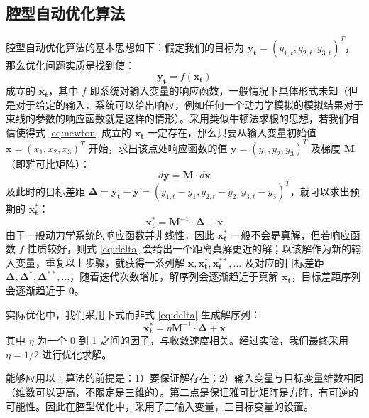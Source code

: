\subsection{腔型自动优化算法}
腔型自动优化算法的基本思想如下：假定我们的目标为 $\mathbf{y_t} = (y_{1,t}, y_{2,t}, y_{3,t})^T$，那么优化问题实质是找到使：
\begin{equation}
\label{eq:newton}
\mathbf{y_t} = f(\mathbf{x_t})
\end{equation}
成立的 $\mathbf{x_t}$，其中 $f$ 即系统对输入变量的响应函数，一般情况下具体形式未知（但是对于给定的输入，系统可以给出响应，例如任何一个动力学模拟的模拟结果对于束线的参数的响应函数就是这样的情形）。采用类似牛顿法求根的思想，若我们相信使得式 \ref{eq:newton} 成立的 $\mathbf{x_t}$ 一定存在，那么只要从输入变量初始值 $\mathbf{x} = (x_{1}, x_{2}, x_{3})^T$ 开始，求出该点处响应函数的值 $\mathbf{y} = (y_{1}, y_{2}, y_{3})^T$ 及梯度 $\mathbf{M}$（即雅可比矩阵）：
\[
d\mathbf{y} = \mathbf{M}\cdot d\mathbf{x}
\]
及此时的目标差距 $\mathbf{\Delta} = \mathbf{y_t}-\mathbf{y} = (y_{1,t}-y_1, y_{2,t}-y_2, y_{3,t}-y_3)^T$，就可以求出预期的 $\mathbf{x_t^*}$：
\begin{equation}
\label{eq:delta}
\mathbf{x_t^*} = \mathbf{M}^{-1}\cdot\mathbf{\Delta}+\mathbf{x}
\end{equation}
由于一般动力学系统的响应函数并非线性，因此 $\mathbf{x_t^*}$ 一般不会是真解，但若响应函数 $f$ 性质较好，则式 \ref{eq:delta} 会给出一个距离真解更近的解；以该解作为新的输入变量，重复以上步骤，就获得一系列解 $\mathbf{x}, \mathbf{x_t^*}, \mathbf{x_t^{**}, \dots}$ 及对应的目标差距 $\mathbf{\Delta}, \mathbf{\Delta^*}, \mathbf{\Delta^{**}, \dots}$，随着迭代次数增加，解序列会逐渐趋近于真解 $\mathbf{x_t}$，目标差距序列会逐渐趋近于 $\mathbf{0}$。

实际优化中，我们采用下式而非式 \ref{eq:delta} 生成解序列：
\begin{equation}
\label{eq:delta2}
\mathbf{x_t^*} = \eta\mathbf{M}^{-1}\cdot\mathbf{\Delta}+\mathbf{x}
\end{equation}
其中 $\eta$ 为一个 0 到 1 之间的因子，与收敛速度相关。经过实验，我们最终采用 $\eta=1/2$ 进行优化求解。

能够应用以上算法的前提是：1）要保证解存在；2）输入变量与目标变量维数相同（维数可以更高，不限定是三维的）。第二点是保证雅可比矩阵是方阵，有可逆的可能性。因此在腔型优化中，采用了三输入变量，三目标变量的设置。

